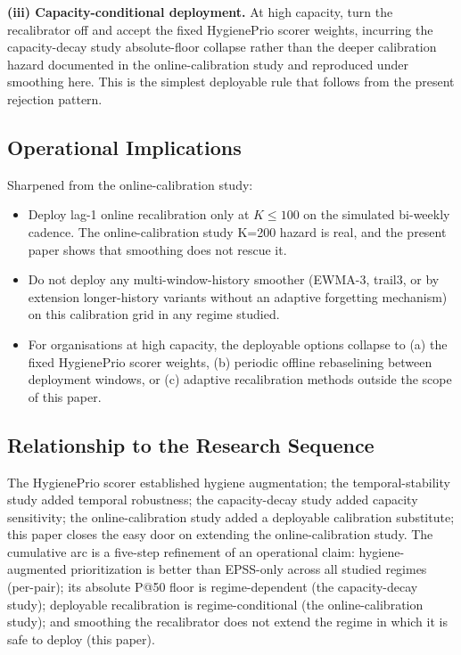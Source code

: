 \textbf{(iii) Capacity-conditional deployment.} At high capacity,
turn the recalibrator off and accept the fixed HygienePrio scorer weights,
incurring the capacity-decay study absolute-floor collapse rather than the
deeper calibration hazard documented in the online-calibration study and reproduced
under smoothing here. This is the simplest
deployable rule that follows from the present rejection pattern.

\subsection{Operational Implications}

Sharpened from the online-calibration study:
\begin{itemize}
\item Deploy lag-1 online recalibration only at $K \leq 100$ on the
simulated bi-weekly cadence. The online-calibration study K=200 hazard is real, and
the present paper shows that smoothing does not rescue it.
\item Do not deploy any multi-window-history smoother (EWMA-3,
trail3, or by extension longer-history variants without an adaptive
forgetting mechanism) on this calibration grid in any regime studied.
\item For organisations at high capacity, the deployable options
collapse to (a) the fixed HygienePrio scorer weights, (b) periodic offline
rebaselining between deployment windows, or (c) adaptive
recalibration methods outside the scope of this paper.
\end{itemize}

\subsection{Relationship to the Research Sequence}

The HygienePrio scorer established hygiene augmentation; the temporal-stability study added temporal
robustness; the capacity-decay study added capacity sensitivity; the online-calibration study added a
deployable calibration substitute; this paper closes the easy door
on extending the online-calibration study. The cumulative arc is a five-step refinement
of an operational claim: hygiene-augmented prioritization is better
than EPSS-only across all studied regimes (per-pair); its absolute
P@50 floor is regime-dependent (the capacity-decay study); deployable recalibration
is regime-conditional (the online-calibration study); and smoothing the recalibrator
does not extend the regime in which it is safe to deploy (this paper).

